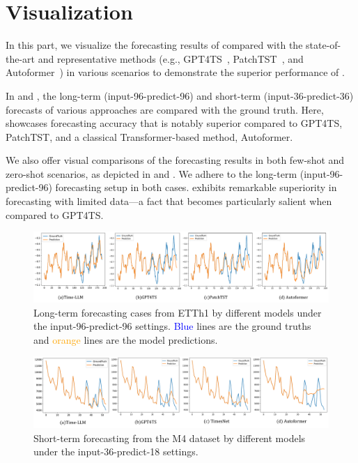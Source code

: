 \section{Visualization}
In this part, we visualize the forecasting results of \method compared with the state-of-the-art and representative methods (e.g., GPT4TS~\citep{zhou2023one}, PatchTST~\citep{nie2022time}, and Autoformer~\citep{wu2021autoformer}) in various scenarios to demonstrate the superior performance of \method. 

In  and , the long-term (input-96-predict-96) and short-term (input-36-predict-36) forecasts of various approaches are compared with the ground truth. Here, \method showcases forecasting accuracy that is notably superior compared to GPT4TS, PatchTST, and a classical Transformer-based method, Autoformer. 

We also offer visual comparisons of the forecasting results in both few-shot and zero-shot scenarios, as depicted in  and . We adhere to the long-term (input-96-predict-96) forecasting setup in both cases. \method exhibits remarkable superiority in forecasting with limited data—a fact that becomes particularly salient when compared to GPT4TS.

\clearpage
\newpage

\begin{figure}[!htbp]
\begin{center}
\centerline{\includegraphics[width=\columnwidth]{figures/visual_long.pdf}}
	\caption{Long-term forecasting cases from ETTh1 by different models under the input-96-predict-96 settings. \textcolor{blue}{Blue} lines are the ground truths and \textcolor{orange}{orange} lines are the model predictions.}
	\label{fig:visual_etth1}
\end{center}
\vspace{-20pt}
\end{figure}

\begin{figure}[!htbp]
\begin{center}
\centerline{\includegraphics[width=\columnwidth]{figures/visual_m4.pdf}}
	\caption{Short-term forecasting from the M4 dataset by different models under the input-36-predict-18 settings.}
	\label{fig:visual_m4}
\end{center}
\vspace{-20pt}
\end{figure}

